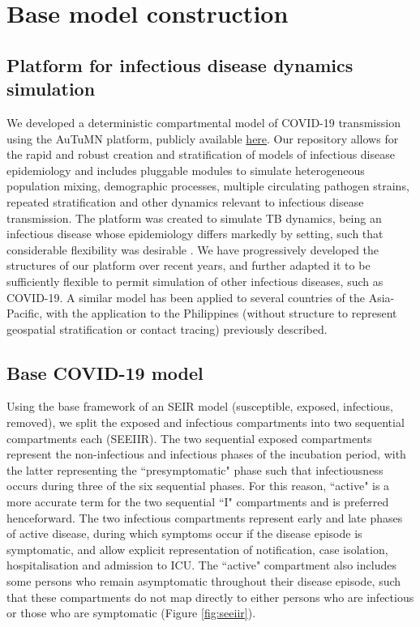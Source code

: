 \section{Base model construction}
\subsection{Platform for infectious disease dynamics simulation}

We developed a deterministic compartmental model of COVID-19 transmission using the AuTuMN platform,
publicly available \href{https://github.com/monash-emu/AuTuMN/}{here}.
Our repository allows for the rapid and robust creation and stratification of models of infectious disease epidemiology and includes pluggable modules to simulate heterogeneous population mixing, demographic processes, multiple circulating pathogen strains, repeated stratification and other dynamics relevant to infectious disease transmission.
The platform was created to simulate TB dynamics, being an infectious disease whose epidemiology differs markedly by setting, such that considerable flexibility was desirable \cite{RN18}.
We have progressively developed the structures of our platform over recent years, and further adapted it to be sufficiently flexible to permit simulation of other infectious diseases, such as COVID-19. A similar model has been applied to several countries of the Asia-Pacific, with the application to the Philippines (without structure to represent geospatial stratification or contact tracing) previously described.\cite{RN79}

\subsection{Base COVID-19 model}
Using the base framework of an SEIR model (susceptible, exposed, infectious, removed), we split the exposed and infectious compartments into two sequential compartments each (SEEIIR). The two sequential exposed compartments represent the non-infectious and infectious phases of the incubation period, with the latter representing the ``presymptomatic" phase such that infectiousness occurs during three of the six sequential phases. For this reason, ``active" is a more accurate term for the two sequential ``I" compartments and is preferred henceforward. The two infectious compartments represent early and late phases of active disease, during which symptoms occur if the disease episode is symptomatic, and allow explicit representation of notification, case isolation, hospitalisation and admission to ICU. The ``active" compartment also includes some persons who remain asymptomatic throughout their disease episode, such that these compartments do not map directly to either persons who are infectious or those who are symptomatic (Figure \ref{fig:seeiir}).

